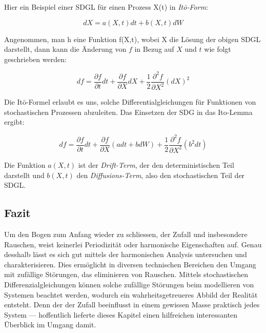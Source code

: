 Hier ein Beispiel einer SDGL für einen Prozess X(t) in \textit{Itō-Form}:

\begin{equation}
	dX = a(X,t) dt + b(X,t) dW
\end{equation}

Angenommen, man h eine Funktion f(X,t), wobei X die Lösung der obigen SDGL darstellt, dann kann die Änderung von $ f $ in Bezug auf $ X $ und $ t $ wie folgt geschrieben werden:

\begin{equation}
	df = \frac{\partial f}{\partial t} dt + \frac{\partial f}{\partial X} dX + \frac{1}{2} \frac{\partial^2 f}{\partial X^2} (dX)^2	
\end{equation}

Die Itō-Formel erlaubt es uns, solche Differentialgleichungen für Funktionen von stochastischen Prozessen abzuleiten. Das Einsetzen der SDG in das Ito-Lemma ergibt:

\begin{equation}
	df = \frac{\partial f}{\partial t} dt + \frac{\partial f}{\partial X} (a dt + b dW) + \frac{1}{2} \frac{\partial^2 f}{\partial X^2} (b^2 dt)
\end{equation}

Die Funktion $ a(X,t) $ ist der \textit{Drift-Term}, der den deterministischen Teil darstellt und $ b(X,t) $ den \textit{Diffusions-Term}, also den stochastischen Teil der SDGL.

\subsection{Fazit\label{brown:fazit}}

Um den Bogen zum Anfang wieder zu schliessen, der Zufall und insbesondere Rauschen, weist keinerlei Periodizität oder harmonische Eigenschaften auf. Genau desshalb lässt es sich gut mittels der harmonischen Analysis untersuchen und charakterisieren. Dies ermöglicht in diversen technischen Bereichen den Umgang mit zufällige Störungen, das eliminieren von Rauschen. 
Mittels stochastischen Differenzialgleichungen können solche zufällige Störungen beim modellieren von Systemen beachtet werden, wodurch ein wahrheitsgetreueres Abbild der Realität entsteht. Denn der der Zufall beeinflusst in einem gewissen Masse praktisch jedes System --- hoffentlich lieferte dieses Kapitel einen hilfreichen interessanten Überblick im Umgang damit.
